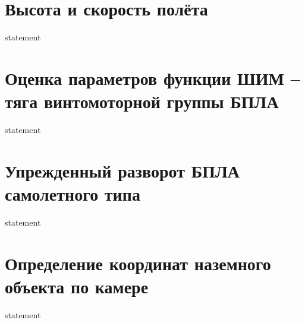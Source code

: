 \section{Высота и скорость полёта}
{statement}

\section{Оценка параметров функции ШИМ -- тяга винтомоторной группы БПЛА}
{statement}

\section{Упрежденный разворот БПЛА самолетного типа}
{statement}

\section{Определение координат наземного объекта по камере}
{statement}